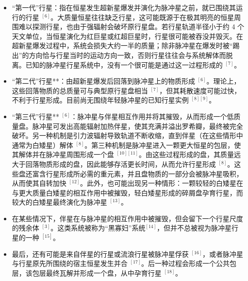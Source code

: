 \begin{itemize}
\item “第一代”行星：指在恒星发生超新星爆发并演化为脉冲星之前，就已围绕其运行的行星 $^{[6]}$。大质量恒星往往缺乏行星，这可能既源于在极其明亮的恒星周围难以探测行星，也由于强辐射会破坏原行星盘。若行星轨道半径小于约 4 个天文单位，当恒星演化为红巨星或红超巨星时，行星很可能被吞没并毁灭。在超新星爆发过程中，系统会损失大约一半的质量；除非脉冲星在爆发时被“踢出”的方向恰与行星当时的运动方向一致，否则行星往往会与系统解体而脱离。已知的脉冲星行星系统中，没有一个很可能是通过这一过程形成的 $^{[7]}$。

\item “第二代”行星**：由超新星爆发后回落到脉冲星上的物质形成 $^{[6]}$。理论上，这些回落物质的总质量可与典型原行星盘相当 $^{[7]}$，但其耗散速度可能过快，不利于行星形成。目前尚无围绕年轻脉冲星的已知行星实例 $^{[8][9]}$。

\item “第三代”行星** $^{[6]}$：脉冲星与伴星相互作用并将其摧毁，从而形成一个低质量盘。脉冲星可发出高能辐射加热伴星，使其充满并溢出罗希瓣，最终被完全破坏。另一种机制是引力波辐射导致轨道不断收缩，直到伴星（在这些情形中通常为白矮星）解体 $^{[8]}$。第三种机制是脉冲星进入一颗更大恒星的包层，使其解体并在脉冲星周围形成一个盘 $^{[10][11]}$。由这些过程形成的盘，其质量远大于回落物质形成的盘，因此能够存活更长时间，从而允许行星形成 $^{[8]}$。这些盘还富含行星形成所必需的重元素，并且盘物质的一部分会被脉冲星吸积，从而使其自转加快 $^{[12]}$。此外，也可能出现另一种情形：一颗较轻的白矮星在与更大质量白矮星的相互作用中被摧毁，轻白矮星形成的碎屑盘孕育行星，而较大的白矮星最终演化为脉冲星 $^{[13]}$。
\item 在某些情况下，伴星在与脉冲星的相互作用中被摧毁，但会留下一个行星尺度的残余体 $^{[3]}$。这类系统被称为“黑寡妇”系统$^{[14]}$，但并不总被视为脉冲星行星的一种 $^{[15]}$。
\item 最后，还有可能是来自伴星的行星或流浪行星被脉冲星俘获 $^{[16]}$，或者脉冲星与行星原先所围绕的宿主恒星发生并合 $^{[17]}$。后一种过程会形成一个公共包层，该包层最终瓦解并形成一个盘，从中孕育行星 $^{[18]}$。
\end{itemize}